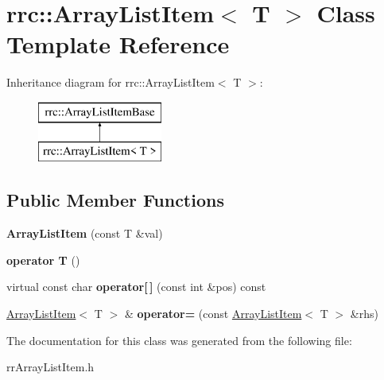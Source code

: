 \hypertarget{classrrc_1_1_array_list_item}{}\section{rrc\+:\+:Array\+List\+Item$<$ T $>$ Class Template Reference}
\label{classrrc_1_1_array_list_item}
Inheritance diagram for rrc\+:\+:Array\+List\+Item$<$ T $>$\+:\begin{figure}[H]
\begin{center}
\leavevmode
\includegraphics[height=2.000000cm]{classrrc_1_1_array_list_item}
\end{center}
\end{figure}
\subsection*{Public Member Functions}
\begin{DoxyCompactItemize}
\item 
\hypertarget{classrrc_1_1_array_list_item_ae67fbd0a39f63f753b63b5bbc9fe18c3}{}{\bfseries Array\+List\+Item} (const T \&val)\label{classrrc_1_1_array_list_item_ae67fbd0a39f63f753b63b5bbc9fe18c3}

\item 
\hypertarget{classrrc_1_1_array_list_item_a200a3d632bab9d5b2672377a4bce309f}{}{\bfseries operator T} ()\label{classrrc_1_1_array_list_item_a200a3d632bab9d5b2672377a4bce309f}

\item 
\hypertarget{classrrc_1_1_array_list_item_a729386debf17cdacf94146911c37f3e1}{}virtual const char {\bfseries operator\mbox{[}$\,$\mbox{]}} (const int \&pos) const \label{classrrc_1_1_array_list_item_a729386debf17cdacf94146911c37f3e1}

\item 
\hypertarget{classrrc_1_1_array_list_item_a0dfee6760c7c7e1a320dd2612491a908}{}\hyperlink{classrrc_1_1_array_list_item}{Array\+List\+Item}$<$ T $>$ \& {\bfseries operator=} (const \hyperlink{classrrc_1_1_array_list_item}{Array\+List\+Item}$<$ T $>$ \&rhs)\label{classrrc_1_1_array_list_item_a0dfee6760c7c7e1a320dd2612491a908}

\end{DoxyCompactItemize}


The documentation for this class was generated from the following file\+:\begin{DoxyCompactItemize}
\item 
rr\+Array\+List\+Item.\+h\end{DoxyCompactItemize}
